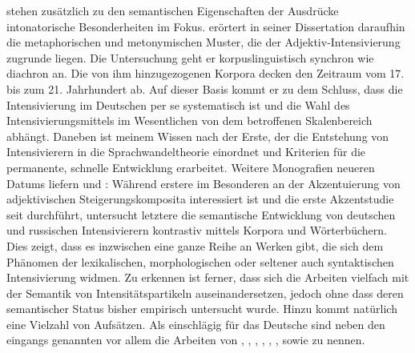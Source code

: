 stehen zusätzlich zu den semantischen Eigenschaften der Ausdrücke intonatorische Besonderheiten im Fokus. {\citet[]{Kirschbaum.2002b}} erörtert in seiner Dissertation daraufhin die metaphorischen und metonymischen Muster, die der Adjektiv-Intensivierung zugrunde liegen. Die Untersuchung geht er korpuslinguistisch synchron wie diachron an. Die von ihm hinzugezogenen Korpora decken den Zeitraum vom 17. bis zum 21. Jahrhundert ab. Auf dieser Basis kommt er zu dem Schluss, dass die Intensivierung im Deutschen per se systematisch ist und die Wahl des Intensivierungsmittels im Wesentlichen von dem betroffenen Skalenbereich abhängt. Daneben ist {\citet[]{Kirschbaum.2002b}} meinem Wissen nach der Erste, der die Entstehung von Intensivierern in die Sprachwandeltheorie einordnet und Kriterien für die permanente, schnelle Entwicklung erarbeitet. Weitere Monografien neueren Datums liefern {\citet[]{Klara.2009}} und {\citet[]{Laitenberger.2016}}: Während erstere im Besonderen an der Akzentuierung von adjektivischen Steigerungskomposita interessiert ist und die erste Akzentstudie seit {\citet[]{Berz.1953}} durchführt, untersucht letztere die semantische Entwicklung von deutschen und russischen Intensivierern kontrastiv mittels Korpora und Wörterbüchern. Dies zeigt, dass es inzwischen eine ganze Reihe an Werken gibt, die sich dem Phänomen der lexikalischen, morphologischen oder seltener auch syntaktischen Intensivierung widmen. Zu erkennen ist ferner, dass sich die Arbeiten vielfach mit der Semantik von Intensitätspartikeln auseinandersetzen, jedoch ohne dass deren semantischer Status bisher empirisch untersucht wurde. Hinzu kommt natürlich eine Vielzahl von Aufsätzen. Als einschlägig für das Deutsche sind neben den eingangs genannten vor allem die Arbeiten von \citet[]{Suscinskij.1981, Suscinskij.1985}, {\citet[]{Hentschel.1998b}}, {\citet[]{Claudi.2006}}, {\citet[]{Breindl.2007}}, {\citet[]{Gutzmann.2012, Gutzmann.2015b}}, \citet[]{Stratton.2020b}, \citet[]{Pheiff.2023} sowie \citet[]{Scheffler.2023} zu nennen.

